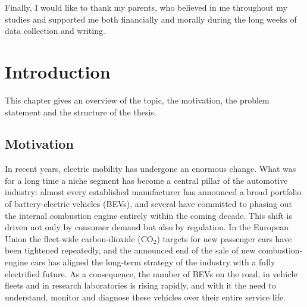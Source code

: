 \documentclass[11pt,a4paper,oneside,parskip=half]{scrreprt}
\begin{document}
Finally, I would like to thank my parents, who believed in me throughout my studies and supported me both financially and morally during the long weeks of data collection and writing.

\tableofcontents
{}

\listoffigures
{}

\listoftables
{}

\clearpage
{}
\setcounter{page}{1}


\chapter{Introduction}
This chapter gives an overview of the topic, the motivation, the problem statement and the structure of the thesis.

\section{Motivation}
In recent years, electric mobility has undergone an enormous change. What was for a long time a niche segment has become a central pillar of the automotive industry: almost every established manufacturer has announced a broad portfolio of battery-electric vehicles (BEVs), and several have committed to phasing out the internal combustion engine entirely within the coming decade. This shift is driven not only by consumer demand but also by regulation. In the European Union the fleet-wide carbon-dioxide (CO$_2$) targets for new passenger cars have been tightened repeatedly, and the announced end of the sale of new combustion-engine cars has aligned the long-term strategy of the industry with a fully electrified future. As a consequence, the number of BEVs on the road, in vehicle fleets and in research laboratories is rising rapidly, and with it the need to understand, monitor and diagnose these vehicles over their entire service life.
\end{document}
